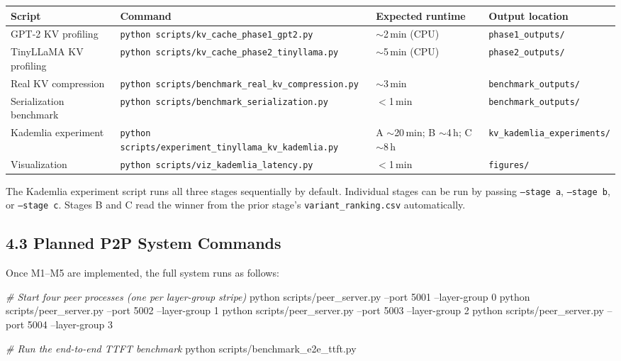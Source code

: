 \documentclass[11pt]{article}
\newenvironment{Shaded}{\small}{}
\newcommand{\AttributeTok}[1]{\textcolor[rgb]{0.49,0.56,0.16}{#1}}
\newcommand{\CommentTok}[1]{\textcolor[rgb]{0.38,0.63,0.69}{\textit{#1}}}
\newcommand{\ExtensionTok}[1]{#1}
\begin{document}
\begin{longtable}[]{@{}llll@{}}
\toprule
Script & Command & Expected runtime & Output location \\
\midrule
\endhead
\bottomrule
\endlastfoot
GPT-2 KV profiling & \texttt{python scripts/kv\_cache\_phase1\_gpt2.py} & $\sim$2\,min (CPU) & \texttt{phase1\_outputs/} \\
TinyLLaMA KV profiling & \texttt{python scripts/kv\_cache\_phase2\_tinyllama.py} & $\sim$5\,min (CPU) & \texttt{phase2\_outputs/} \\
Real KV compression & \texttt{python scripts/benchmark\_real\_kv\_compression.py} & $\sim$3\,min & \texttt{benchmark\_outputs/} \\
Serialization benchmark & \texttt{python scripts/benchmark\_serialization.py} & $<$1\,min & \texttt{benchmark\_outputs/} \\
Kademlia experiment & \texttt{python scripts/experiment\_tinyllama\_kv\_kademlia.py} & A $\sim$20\,min; B $\sim$4\,h; C $\sim$8\,h & \texttt{kv\_kademlia\_experiments/} \\
Visualization & \texttt{python scripts/viz\_kademlia\_latency.py} & $<$1\,min & \texttt{figures/} \\
\end{longtable}

The Kademlia experiment script runs all three stages sequentially by
default. Individual stages can be run by passing \texttt{--stage a},
\texttt{--stage b}, or \texttt{--stage c}. Stages B and C read the
winner from the prior stage's \texttt{variant\_ranking.csv}
automatically.

\subsection{4.3 Planned P2P System Commands}

Once M1--M5 are implemented, the full system runs as follows:

\begin{Shaded}
\begin{Highlighting}[]
\CommentTok{\# Start four peer processes (one per layer-group stripe)}
\ExtensionTok{python} scripts/peer\_server.py \AttributeTok{--port} 5001 \AttributeTok{--layer-group} 0
\ExtensionTok{python} scripts/peer\_server.py \AttributeTok{--port} 5002 \AttributeTok{--layer-group} 1
\ExtensionTok{python} scripts/peer\_server.py \AttributeTok{--port} 5003 \AttributeTok{--layer-group} 2
\ExtensionTok{python} scripts/peer\_server.py \AttributeTok{--port} 5004 \AttributeTok{--layer-group} 3

\CommentTok{\# Run the end-to-end TTFT benchmark}
\ExtensionTok{python} scripts/benchmark\_e2e\_ttft.py
\end{Highlighting}
\end{Shaded}
\end{document}
